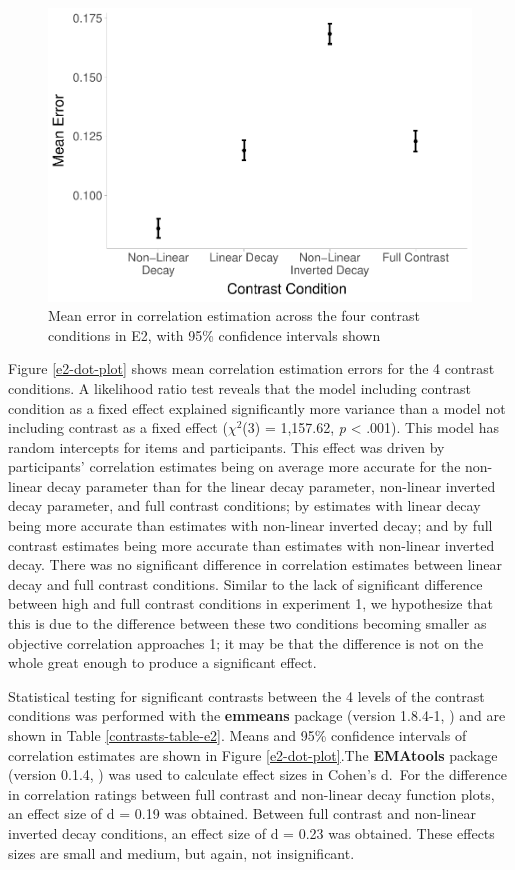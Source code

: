 \documentclass[preprint, 3p,
authoryear]{elsarticle} %
\begin{document}
\begin{figure}

\includegraphics[width=0.5\linewidth]{contrast_and_scatterplots_files/figure-latex/e2-dot-plot-1} \hfill{}

\caption{\label{e2-dot-plot}Mean error in correlation estimation across the four contrast conditions in E2, with 95\% confidence intervals shown}\label{fig:e2-dot-plot}
\end{figure}

Figure \ref{e2-dot-plot} shows mean correlation estimation errors for
the 4 contrast conditions. A likelihood ratio test reveals that the
model including contrast condition as a fixed effect explained
significantly more variance than a model not including contrast as a
fixed effect (\(\chi^2\)(3) = 1,157.62, \emph{p} \textless{} .001). This
model has random intercepts for items and participants. This effect was
driven by participants' correlation estimates being on average more
accurate for the non-linear decay parameter than for the linear decay
parameter, non-linear inverted decay parameter, and full contrast
conditions; by estimates with linear decay being more accurate than
estimates with non-linear inverted decay; and by full contrast estimates
being more accurate than estimates with non-linear inverted decay. There
was no significant difference in correlation estimates between linear
decay and full contrast conditions. Similar to the lack of significant
difference between high and full contrast conditions in experiment 1, we
hypothesize that this is due to the difference between these two
conditions becoming smaller as objective correlation approaches 1; it
may be that the difference is not on the whole great enough to produce a
significant effect.

Statistical testing for significant contrasts between the 4 levels of
the contrast conditions was performed with the \textbf{emmeans} package
(version 1.8.4-1, \citealp{emmeans}) and are shown in Table
\ref{contrasts-table-e2}. Means and 95\% confidence intervals of
correlation estimates are shown in Figure \ref{e2-dot-plot}.The
\textbf{EMAtools} package (version 0.1.4, \citealp{ematools}) was used
to calculate effect sizes in Cohen's d.~For the difference in
correlation ratings between full contrast and non-linear decay function
plots, an effect size of d = 0.19 was obtained. Between full contrast
and non-linear inverted decay conditions, an effect size of d = 0.23 was
obtained. These effects sizes are small and medium, but again, not
insignificant.
\end{document}
